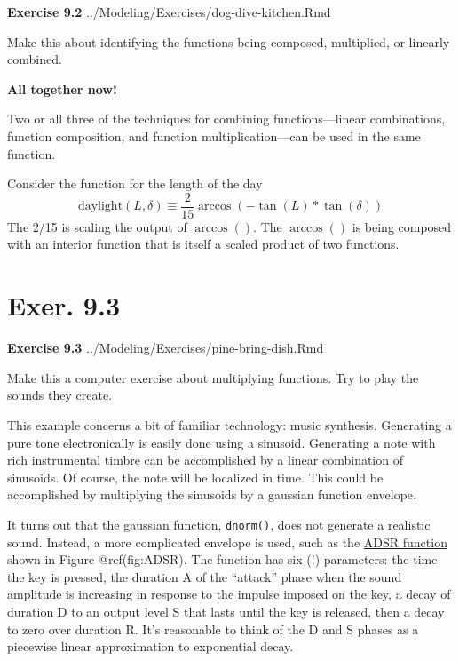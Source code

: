 \documentclass[
  letterpaper,
  DIV=11,
  numbers=noendperiod,
  oneside]{article}
\begin{document}
\begin{multicols}{2}
\textbf{Exercise 9.2} ../Modeling/Exercises/dog-dive-kitchen.Rmd

Make this about identifying the functions being composed, multiplied, or
linearly combined.

\textbf{All together now!}

Two or all three of the techniques for combining functions---linear
combinations, function composition, and function multiplication---can be
used in the same function.

Consider the function for the length of the day
\[\text{daylight}(L, \delta) \equiv \frac{2}{15} \arccos\left(-\tan(L)*\tan(\delta)\right)\]
The 2/15 is scaling the output of \(\arccos()\). The \(\arccos()\) is
being composed with an interior function that is itself a scaled product
of two functions.

\hypertarget{exer.-9.3}{%
\section*{Exer. 9.3}\label{exer.-9.3}}

\textbf{Exercise 9.3} ../Modeling/Exercises/pine-bring-dish.Rmd

Make this a computer exercise about multiplying functions. Try to play
the sounds they create.

This example concerns a bit of familiar technology: music synthesis.
Generating a pure tone electronically is easily done using a sinusoid.
Generating a note with rich instrumental timbre can be accomplished by a
linear combination of sinusoids. Of course, the note will be localized
in time. This could be accomplished by multiplying the sinusoids by a
gaussian function envelope.

It turns out that the gaussian function, \texttt{dnorm()}, does not
generate a realistic sound. Instead, a more complicated envelope is
used, such as the
\href{https://en.wikipedia.org/wiki/Envelope_(music)}{ADSR function}
shown in Figure @ref(fig:ADSR). The function has six (!) parameters: the
time the key is pressed, the duration A of the ``attack'' phase when the
sound amplitude is increasing in response to the impulse imposed on the
key, a decay of duration D to an output level S that lasts until the key
is released, then a decay to zero over duration R. It's reasonable to
think of the D and S phases as a piecewise linear approximation to
exponential decay.

\begin{figure}


\end{figure}
\end{multicols}
\end{document}
